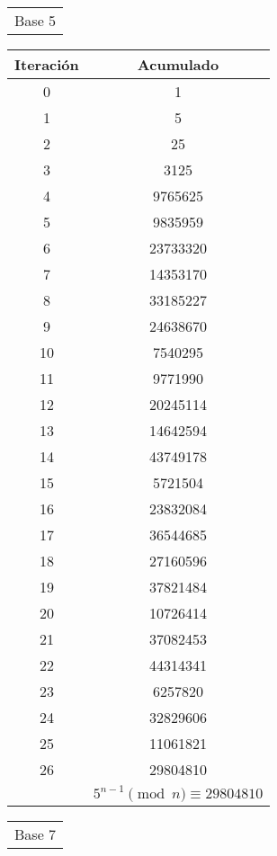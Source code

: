 \documentclass[fleqn]{article}
\begin{document}
        \begin{tabular}{c}
            Base 5 \\
        \end{tabular}
        \begin{tabular}{c | c}
            Iteración & Acumulado \\ \hline
            0 & 1 \\
            1 & 5   \\
            2 & 25  \\
            3 & 3125    \\
            4 & 9765625     \\
            5 & 9835959     \\
            6 & 23733320    \\
            7 & 14353170    \\
            8 & 33185227    \\
            9 & 24638670    \\
           10 & 7540295     \\
           11 & 9771990     \\
           12 & 20245114    \\
           13 & 14642594    \\
           14 & 43749178    \\
           15 & 5721504     \\
           16 & 23832084    \\
           17 & 36544685    \\
           18 & 27160596    \\
           19 & 37821484    \\
           20 & 10726414    \\
           21 & 37082453    \\
           22 & 44314341    \\
           23 & 6257820     \\
           24 & 32829606    \\
           25 & 11061821    \\
           26 & 29804810    \\ \hline
           & $ 5^{n-1} \pmod{n} \equiv 29804810 $
        \end{tabular}
        \begin{tabular}{c}
            Base 7 \\
        \end{tabular}
\end{document}
